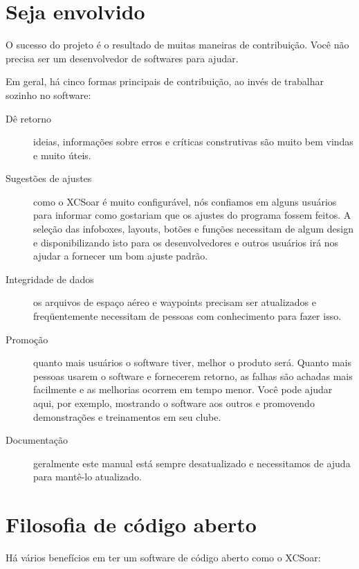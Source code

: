 \section{Seja envolvido}

O sucesso do projeto é o resultado de muitas maneiras de contribuição. Você não precisa ser um desenvolvedor de softwares para ajudar.

Em geral, há cinco formas principais de contribuição, ao invés de trabalhar sozinho no software:

\begin{description}
\item[Dê retorno]
ideias, informações sobre erros e críticas construtivas são muito bem vindas e muito úteis.
\item[Sugestões de ajustes]
como o XCSoar é muito configurável, nós confiamos em alguns usuários para informar como gostariam que os ajustes do programa fossem feitos.  A seleção das infoboxes, layouts, botões e funções necessitam de algum design e disponibilizando isto para os desenvolvedores e outros usuários irá nos ajudar a fornecer um bom ajuste padrão.
\item[Integridade de dados]
os arquivos de espaço aéreo e waypoints precisam ser atualizados e freqüentemente necessitam de pessoas com conhecimento para fazer isso.
\item[Promoção]  quanto mais usuários o software tiver, melhor o produto será.  Quanto mais pessoas usarem o software e fornecerem retorno, as falhas são achadas mais facilmente e as melhorias ocorrem em tempo menor.  Você pode ajudar aqui, por exemplo, mostrando o software aos outros e promovendo demonstrações e treinamentos em seu clube.
\item[Documentação]  geralmente este manual está sempre desatualizado e necessitamos de ajuda para mantê-lo atualizado.
\end{description}


\section{Filosofia de código aberto}

Há vários benefícios em ter um software de código aberto como o XCSoar:

